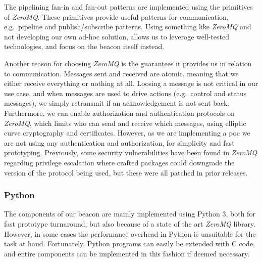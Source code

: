The pipelining fan-in and fan-out patterns are implemented using the primitives of \textit{ZeroMQ}.
These primitives provide useful patterns for communication, e.g.\ pipeline and publish/subscribe patterns.
Using something like \textit{ZeroMQ} and not developing our own ad-hoc solution, allows us to leverage well-tested technologies, and focus on the beacon itself instead.

Another reason for choosing \textit{ZeroMQ} is the guarantees it provides us in relation to communication.
Messages sent and received are atomic, meaning that we either receive everything or nothing at all.
Loosing a message is not critical in our use case, and when messages are used to drive actions (e.g.\ control and status messages), we simply retransmit if an acknowledgement is not sent back.
Furthermore, we can enable authorization and authentication protocols on \textit{ZeroMQ}, which limits who can send and receive which messages, using elliptic curve cryptography and certificates.
However, as we are implementing a \gls{poc} we are not using any authentication and authorization, for simplicity and fast prototyping.
Previously, some security vulnerabilities have been found in \textit{ZeroMQ} regarding privilege escalation where crafted packages could downgrade the version of the protocol being used, but these were all patched in prior releases.


\subsubsection{Python}
The components of our beacon are mainly implemented using Python 3, both for fast prototype turnaround, but also because of a state of the art \textit{ZeroMQ} library.
However, in some cases the performance overhead in Python is unsuitable for the task at hand.
Fortunately, Python programs can easily be extended with C code, and entire components can be implemented in this fashion if deemed necessary.

